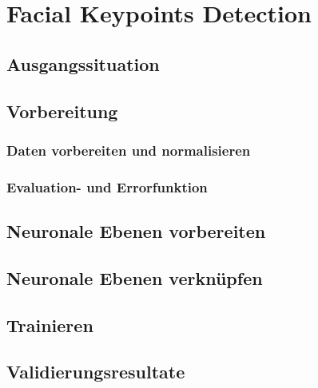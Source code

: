\chapter{Facial Keypoints Detection}
\label{cha:Facial Keypoints Detection}

\section{Ausgangssituation}

\section{Vorbereitung}

\subsection{Daten vorbereiten und normalisieren}

\subsection{Evaluation- und Errorfunktion}

\section{Neuronale Ebenen vorbereiten}

\section{Neuronale Ebenen verknüpfen}

\section{Trainieren}

\section{Validierungsresultate}